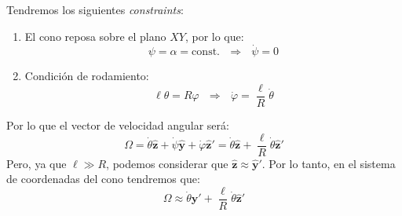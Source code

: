 \documentclass[]{article}
\numberwithin{equation}{section}
\newcommand{\0}{\textcolor{gray}{0}}
\newcommand{\yv}{\mathbf{y}}
\newcommand{\zv}{\mathbf{z}}
\newcommand{\Vv}{\mathbf{V}}
\newcommand{\yhat}{\hat{\yv}}
\newcommand{\zhat}{\hat{\zv}}
\begin{document}
Tendremos los siguientes \textit{constraints}:
\begin{enumerate}
	\item El cono reposa sobre el plano \(XY\), por lo que:
	\begin{equation}
		\psi = \alpha = \mathrm{const.} ~~~ \Rightarrow ~~~ \dot{\psi} = 0
	\end{equation}
	\item Condición de rodamiento:
	\begin{equation}
		\ell \theta = R \varphi ~~~ \Rightarrow ~~~ \dot{\varphi} = \frac{\ell}{R} \dot{\theta} \label{equiv_angulos}
	\end{equation}
\end{enumerate}

Por lo que el vector de velocidad angular será:
\begin{equation}
	\Omega =  \dot{\theta}\zhat + \dot{\psi}\yhat + \dot{\varphi}\zhat' = \dot{\theta}\zhat + \frac{\ell}{R} \dot{\theta}\zhat'
\end{equation}
Pero, ya que \(\ell \gg R\), podemos considerar que \(\zhat \approx \yhat'\). Por lo tanto, en el sistema de coordenadas del cono tendremos que:
\begin{equation}
	\Omega \approx \dot{\theta}\yhat' + \frac{\ell}{R} \dot{\theta}\zhat'
\end{equation}
\end{document}
